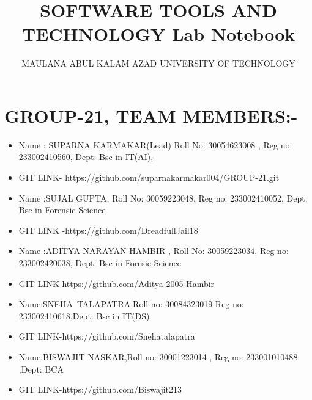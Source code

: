 \documentclass{article}
\begin{document}
\title{SOFTWARE TOOLS AND TECHNOLOGY Lab Notebook}
\author{MAULANA ABUL KALAM AZAD UNIVERSITY OF TECHNOLOGY}
\date{}
\maketitle

\section*{GROUP-21, TEAM MEMBERS:-}
\begin{itemize}
    \item Name : SUPARNA KARMAKAR(Lead)
        Roll No: 30054623008 ,
       Reg no: 233002410560, 
       Dept:  Bsc in IT(AI),
       \item GIT LINK- https://github.com/suparnakarmakar004/GROUP-21.git
    \item Name :SUJAL GUPTA, 
        Roll No: 30059223048,
        Reg no: 233002410052,
        Dept: Bsc in Forensic Science
        \item GIT LINK -https://github.com/DreadfullJail18
    \item Name :ADITYA NARAYAN HAMBIR , 
       Roll No:  30059223034,
       Reg no: 233002420038,
       Dept: Bsc in Foresic Science
       \item GIT LINK-https://github.com/Aditya-2005-Hambir 
    \item Name:SNEHA TALAPATRA,Roll no: 30084323019
Reg no:  233002410618,Dept:   Bsc in IT(DS)
\item GIT LINK-https://github.com/Snehatalapatra
\item Name:BISWAJIT NASKAR,Roll no:  30001223014 , Reg no: 233001010488 ,Dept:  BCA
\item GIT LINK-https://github.com/Biswajit213
\end{itemize}
\end{document}
